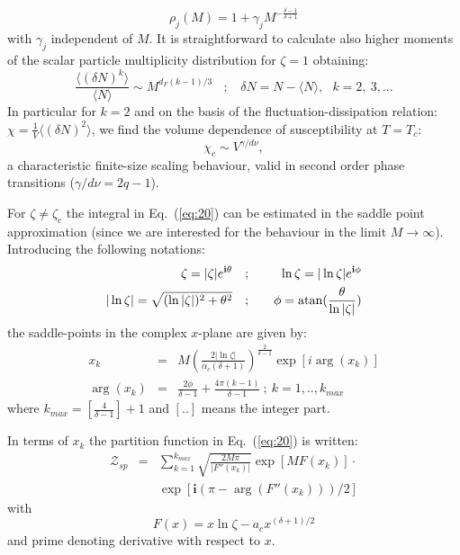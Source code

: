 \documentclass[aps,pre,showpacs,amsmath,amssymb,superscriptaddress,twocolumn]{revtex4-1}
\begin{document}
\begin{equation}
\rho_j(M)=1 + \gamma_j M^{-\frac{\delta - 1}{\delta +1}}
\label{eq:25}
\end{equation}
with $\gamma_j$ independent of $M$. It is straightforward to calculate also higher moments of the scalar particle multiplicity distribution for $\zeta=1$ obtaining:
\begin{equation}
\frac{\langle (\delta N)^k \rangle}{\langle N \rangle} \sim M^{d_F (k-1)/3}~~~~;~~~~\delta N = N - \langle N \rangle,~~~k=2,~3,...
\label{eq:26}
\end{equation}
In particular for $k=2$ and on the basis of the fluctuation-dissipation relation: $\chi=\frac{1}{V}\langle (\delta N)^2 \rangle$, we find the volume dependence of susceptibility at $T=T_c$: 
$$\chi_c \sim V^{\gamma/d \nu},$$
a characteristic finite-size scaling behaviour, valid in second order phase transitions ($\gamma/d \nu=2 q -1$).

For $\zeta \neq \zeta_c$ the integral in Eq.~(\ref{eq:20}) can be estimated in the saddle point approximation (since we are interested for the behaviour in the limit $M \to \infty$). Introducing the following notations:
\begin{eqnarray}
\zeta = \vert \zeta \vert e^{\mathbf{i} \theta}~~~&;&~~~\ln \zeta =\vert \ln \zeta \vert e^{\mathbf{i} \phi} \nonumber \\
\vert \ln \zeta \vert = \sqrt{(\ln \vert \zeta \vert)^2 + \theta^2}~~~&;&~~~
\phi =\rm{atan}(\frac{\theta}{\ln \vert \zeta \vert})
\label{eq:27}
\end{eqnarray}
the saddle-points in the complex $x$-plane are given by:
\begin{eqnarray}
x_k&=&M \left(\frac{2 \vert \ln \zeta \vert}{\alpha_c (\delta +1)}\right)^{\frac{2}{\delta - 1}} \exp[i \arg(x_k)] \nonumber \\\arg(x_k)&=&\frac{2 \phi}{\delta -1} + \frac{4 \pi (k-1)}{\delta -1}~;~k=1,..,k_{max}
\label{eq:28}
\end{eqnarray}
where $k_{max}=\left[\frac{4}{\delta -1}\right] + 1$ and $[..]$ means the integer part.

In terms of $x_k$ the partition function in Eq.~(\ref{eq:20}) is written:
\begin{eqnarray}
\mathcal{Z}_{sp}&=&\sum_{k=1}^{k_{max}} \sqrt{\frac{2 M \pi}{\vert F''(x_k) \vert}} \exp[M F(x_k)] \cdot \nonumber \\
&&\exp[ \mathbf{i} (\pi -\arg(F''(x_k)))/2] 
\label{eq:29}
\end{eqnarray}
with
\begin{equation}
F(x)=x \ln \zeta - a_c x^{(\delta + 1)/2}
\label{eq:30}
\end{equation}
and prime denoting derivative with respect to $x$. 
\end{document}
